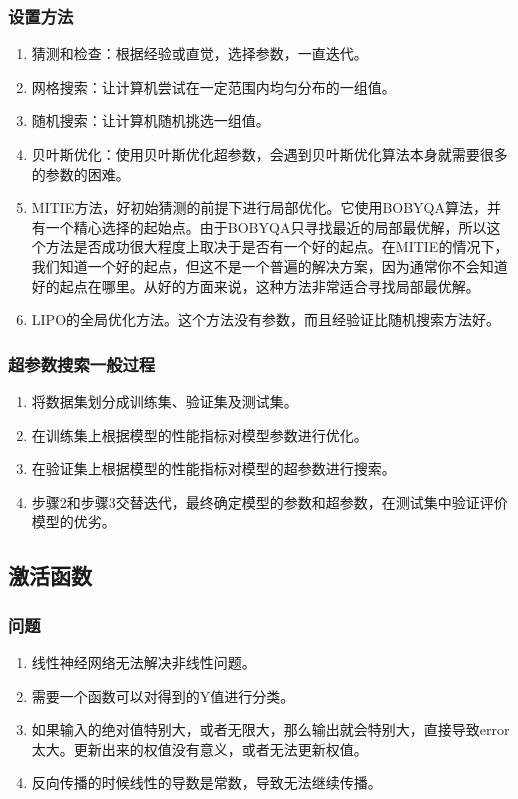 \documentclass[UTF8]{ctexart}
\begin{document}
\subsubsection{设置方法}
\begin{enumerate}
	\item 猜测和检查：根据经验或直觉，选择参数，一直迭代。
	\item 网格搜索：让计算机尝试在一定范围内均匀分布的一组值。
	\item 随机搜索：让计算机随机挑选一组值。
	\item 贝叶斯优化：使用贝叶斯优化超参数，会遇到贝叶斯优化算法本身就需要很多的参数的困难。
	\item MITIE方法，好初始猜测的前提下进行局部优化。它使用BOBYQA算法，并有一个精心选择的起始点。由于BOBYQA只寻找最近的局部最优解，所以这个方法是否成功很大程度上取决于是否有一个好的起点。在MITIE的情况下，我们知道一个好的起点，但这不是一个普遍的解决方案，因为通常你不会知道好的起点在哪里。从好的方面来说，这种方法非常适合寻找局部最优解。
	\item LIPO的全局优化方法。这个方法没有参数，而且经验证比随机搜索方法好。
\end{enumerate}
\subsubsection{超参数搜索一般过程}
\begin{enumerate}
	\item 将数据集划分成训练集、验证集及测试集。
	\item 在训练集上根据模型的性能指标对模型参数进行优化。
	\item 在验证集上根据模型的性能指标对模型的超参数进行搜索。
	\item 步骤2和步骤3交替迭代，最终确定模型的参数和超参数，在测试集中验证评价模型的优劣。
\end{enumerate}

\subsection{激活函数}
\subsubsection{问题}
\begin{enumerate}
	\item 线性神经网络无法解决非线性问题。
	\item 需要一个函数可以对得到的Y值进行分类。
	\item 如果输入的绝对值特别大，或者无限大，那么输出就会特别大，直接导致error太大。更新出来的权值没有意义，或者无法更新权值。
	\item 反向传播的时候线性的导数是常数，导致无法继续传播。
\end{enumerate}
\end{document}

